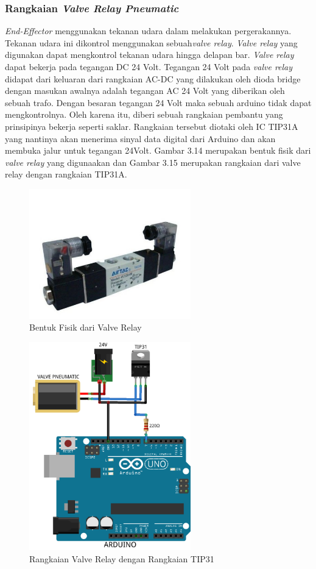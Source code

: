 \subsubsection{Rangkaian \textit{Valve Relay Pneumatic}}
\textit{End-Effector} menggunakan tekanan udara dalam melakukan pergerakannya. Tekanan udara ini dikontrol menggunakan sebuah\textit{valve relay}. \textit{Valve relay} yang digunakan dapat mengkontrol tekanan udara hingga delapan bar. \textit{Valve relay} dapat bekerja pada tegangan DC 24 Volt. Tegangan 24 Volt pada \textit{valve relay} didapat dari keluaran dari rangkaian AC-DC yang dilakukan oleh dioda bridge dengan masukan awalnya adalah tegangan AC 24 Volt yang diberikan oleh sebuah trafo. Dengan besaran tegangan 24 Volt maka sebuah arduino tidak dapat mengkontrolnya. Oleh karena itu, diberi sebuah rangkaian pembantu yang prinsipinya bekerja seperti saklar. Rangkaian tersebut diotaki oleh IC TIP31A yang nantinya akan menerima sinyal data digital dari Arduino dan akan membuka jalur untuk tegangan 24Volt. Gambar 3.14 merupakan bentuk fisik dari \textit{valve relay} yang digunaakan dan Gambar 3.15 merupakan rangkaian dari valve relay dengan rangkaian TIP31A.
\begin{figure}[H]
	\centering
	\includegraphics[width=7cm]{gambar/relay.jpg}
	\caption{Bentuk Fisik dari Valve Relay}
\end{figure}
\begin{figure}[H]
	\centering
	\includegraphics[width=7cm]{gambar/tip31.png}
	\caption{Rangkaian Valve Relay dengan Rangkaian TIP31}
\end{figure}
